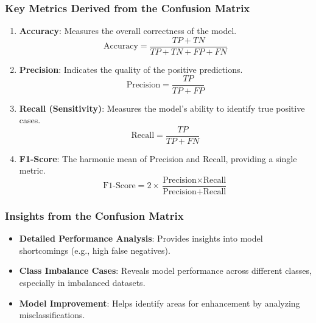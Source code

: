 \documentclass[aspectratio=169]{beamer}
\begin{document}
\begin{frame}[fragile]
    \frametitle{Key Metrics Derived from the Confusion Matrix}
    \begin{enumerate}
        \item \textbf{Accuracy}: Measures the overall correctness of the model.
        \[
        \text{Accuracy} = \frac{TP + TN}{TP + TN + FP + FN}
        \]

        \item \textbf{Precision}: Indicates the quality of the positive predictions.
        \[
        \text{Precision} = \frac{TP}{TP + FP}
        \]

        \item \textbf{Recall (Sensitivity)}: Measures the model's ability to identify true positive cases.
        \[
        \text{Recall} = \frac{TP}{TP + FN}
        \]

        \item \textbf{F1-Score}: The harmonic mean of Precision and Recall, providing a single metric.
        \[
        \text{F1-Score} = 2 \times \frac{\text{Precision} \times \text{Recall}}{\text{Precision} + \text{Recall}}
        \]
    \end{enumerate}
\end{frame}

\begin{frame}[fragile]
    \frametitle{Insights from the Confusion Matrix}
    \begin{itemize}
        \item \textbf{Detailed Performance Analysis}: Provides insights into model shortcomings (e.g., high false negatives).
        \item \textbf{Class Imbalance Cases}: Reveals model performance across different classes, especially in imbalanced datasets.
        \item \textbf{Model Improvement}: Helps identify areas for enhancement by analyzing misclassifications.
    \end{itemize}
\end{frame}
\end{document}
